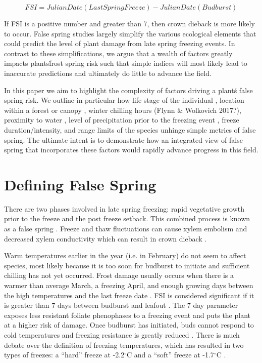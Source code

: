 \documentclass{article}\usepackage[]{graphicx}\usepackage[]{color}
\begin{document}
\[ FSI = Julian Date (Last Spring Freeze) - Julian Date (Budburst) \]

If FSI is a positive number and greater than 7, then crown dieback is more likely to occur. False spring studies largely simplify the various ecological elements that could predict the level of plant damage from late spring freezing events. In contrast to these simplifications, we argue that a wealth of factors greatly impacts plants\' frost spring risk such that simple indices will most likely lead to inaccurate predictions and ultimately do little to advance the field. 

In this paper we aim to highlight the complexity of factors driving a plant\'s false spring risk. We outline in particular how life stage of the individual \citep{Caffarra2011}, location within a forest or canopy \citep{Augspurger2013}, winter chilling hours (Flynn \& Wolkovich 2017?), proximity to water \citep{Gu2008}, level of precipitation prior to the freezing event \citep{Anderegg2013}, freeze duration/intensity, and range limits of the species \citep{Martin2010} unhinge simple metrics of false spring. The ultimate intent is to demonstrate how an integrated view of false spring that incorporates these factors would rapidly advance progress in this field.  

\section{Defining False Spring}
There are two phases involved in late spring freezing: rapid vegetative growth prior to the freeze and the post freeze setback. This combined process is known as a false spring \citep{Gu2008}. Freeze and thaw fluctuations can cause xylem embolism and decreased xylem conductivity which can result in crown dieback \citep{Gu2008}.

Warm temperatures earlier in the year (i.e. in February) do not seem to affect species, most likely because it is too soon for budburst to initiate and sufficient chilling has not yet occurred. Frost damage usually occurs when there is a warmer than average March, a freezing April, and enough growing days between the high temperatures and the last freeze date \citep{Augspurger2013}. 
FSI is considered significant if it is greater than 7 days between budburst and leafout \citep{Peterson2014}. The 7 day parameter exposes less resistant foliate phenophases to a freezing event and puts the plant at a higher risk of damage. Once budburst has initiated, buds cannot respond to cold temperatures and freezing resistance is greatly reduced \citep{Vitasse2014, Lenz2013, Taschler2004}. There is much debate over the definition of freezing temperatures, which has resulted in two types of freezes: a ``hard'' freeze at -2.2$^{\circ}$C and a ``soft'' freeze at -1.7$^{\circ}$C \citep{Augspurger2013, Kodra2011, Vavrus2006}.
\end{document}
